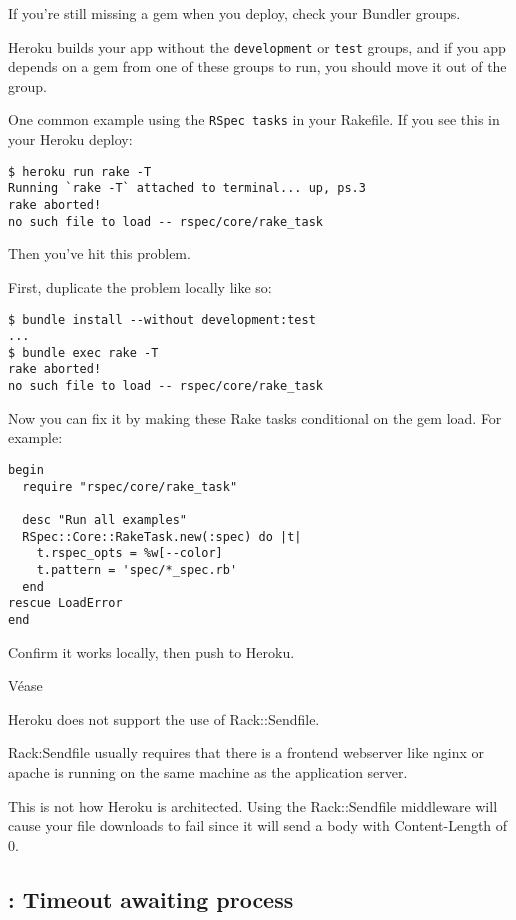 
If you’re still missing a gem when you deploy, check your Bundler
groups.

Heroku builds your app without the \verb|development| or \verb|test|
groups, and if you app depends on a gem from one of these groups
to run, you should move it out of the group.

One common example using the \verb|RSpec tasks| in your Rakefile. 
If you see this in your Heroku deploy:
\begin{verbatim}
$ heroku run rake -T
Running `rake -T` attached to terminal... up, ps.3
rake aborted!
no such file to load -- rspec/core/rake_task
\end{verbatim}
Then you’ve hit this problem. 

First, duplicate the problem locally like so:
\begin{verbatim}
$ bundle install --without development:test
...
$ bundle exec rake -T
rake aborted!
no such file to load -- rspec/core/rake_task
\end{verbatim}
Now you can fix it by making these Rake tasks conditional on the gem load. 
For example:
\begin{verbatim}
begin
  require "rspec/core/rake_task"

  desc "Run all examples"
  RSpec::Core::RakeTask.new(:spec) do |t|
    t.rspec_opts = %w[--color]
    t.pattern = 'spec/*_spec.rb'
  end
rescue LoadError
end
\end{verbatim}
Confirm it works locally, then push to Heroku.


Véase


Heroku does not support the use of Rack::Sendfile. 

Rack:Sendfile
usually requires that there is a frontend webserver like nginx or
apache is running on the same machine as the application server.

This is not how Heroku is architected. Using the Rack::Sendfile
middleware will cause your file downloads to fail since it will
send a body with Content-Length of 0.

\subsection{: Timeout awaiting process}

